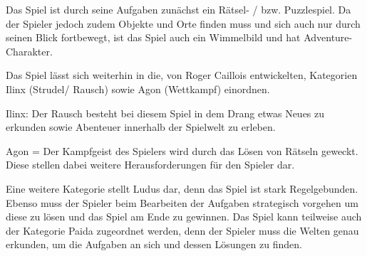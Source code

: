 
Das Spiel ist durch seine Aufgaben zunächst ein Rätsel- / bzw. Puzzlespiel. Da der Spieler jedoch zudem Objekte und Orte finden muss und sich auch nur durch seinen Blick fortbewegt, ist das Spiel auch ein Wimmelbild und hat Adventure-Charakter.

Das Spiel lässt sich weiterhin in die, von Roger Caillois entwickelten, Kategorien Ilinx (Strudel/ Rausch) sowie Agon (Wettkampf) einordnen. 

Ilinx: Der Rausch besteht bei diesem Spiel in dem Drang etwas Neues zu erkunden sowie Abenteuer innerhalb der Spielwelt zu erleben.

Agon = Der Kampfgeist des Spielers wird durch das Lösen von Rätseln geweckt. Diese stellen dabei weitere Herausforderungen für den Spieler dar.

Eine weitere Kategorie stellt Ludus dar, denn das Spiel ist stark Regelgebunden. Ebenso muss der Spieler beim Bearbeiten der Aufgaben strategisch vorgehen um diese zu lösen und das Spiel am Ende zu gewinnen. Das Spiel kann teilweise auch der Kategorie Paida zugeordnet werden, denn der Spieler muss die Welten genau erkunden, um die Aufgaben an sich und dessen Lösungen zu finden.